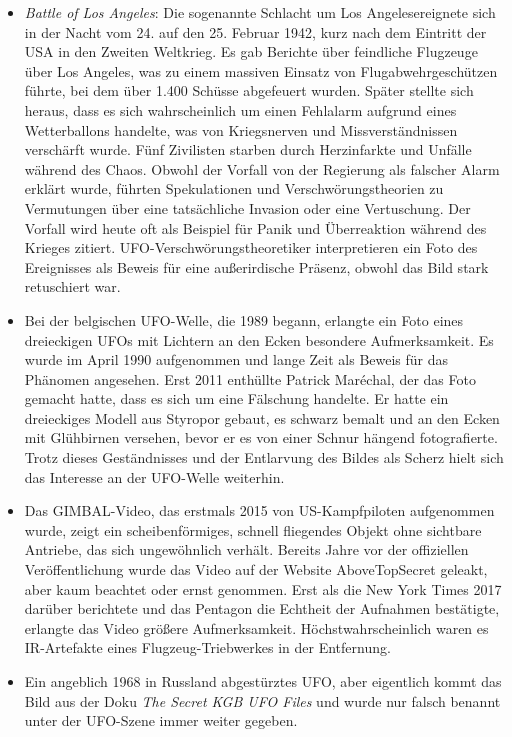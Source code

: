 \documentclass{scrartcl}
\begin{document}
\begin{itemize}
	\item \textit{Battle of Los Angeles}: Die sogenannte \frq Schlacht um Los Angeles\flq ereignete sich in der Nacht vom 24. auf den 25. Februar 1942, kurz nach dem Eintritt der USA in den Zweiten Weltkrieg. Es gab Berichte über feindliche Flugzeuge über Los Angeles, was zu einem massiven Einsatz von Flugabwehrgeschützen führte, bei dem über 1.400 Schüsse abgefeuert wurden. Später stellte sich heraus, dass es sich wahrscheinlich um einen Fehlalarm aufgrund eines Wetterballons handelte, was von Kriegsnerven und Missverständnissen verschärft wurde. Fünf Zivilisten starben durch Herzinfarkte und Unfälle während des Chaos. Obwohl der Vorfall von der Regierung als falscher Alarm erklärt wurde, führten Spekulationen und Verschwörungstheorien zu Vermutungen über eine tatsächliche Invasion oder eine Vertuschung. Der Vorfall wird heute oft als Beispiel für Panik und Überreaktion während des Krieges zitiert. UFO-Verschwörungstheoretiker interpretieren ein Foto des Ereignisses als Beweis für eine außerirdische Präsenz, obwohl das Bild stark retuschiert war. 
	\item Bei der belgischen UFO-Welle, die 1989 begann, erlangte ein Foto eines dreieckigen UFOs mit Lichtern an den Ecken besondere Aufmerksamkeit. Es wurde im April 1990 aufgenommen und lange Zeit als Beweis für das Phänomen angesehen. Erst 2011 enthüllte Patrick Maréchal, der das Foto gemacht hatte, dass es sich um eine Fälschung handelte. Er hatte ein dreieckiges Modell aus Styropor gebaut, es schwarz bemalt und an den Ecken mit Glühbirnen versehen, bevor er es von einer Schnur hängend fotografierte. Trotz dieses Geständnisses und der Entlarvung des Bildes als Scherz hielt sich das Interesse an der UFO-Welle weiterhin. 
	\item Das \frq GIMBAL\flq-Video, das erstmals 2015 von US-Kampfpiloten aufgenommen wurde, zeigt ein scheibenförmiges, schnell fliegendes Objekt ohne sichtbare Antriebe, das sich ungewöhnlich verhält. Bereits Jahre vor der offiziellen Veröffentlichung wurde das Video auf der Website AboveTopSecret geleakt, aber kaum beachtet oder ernst genommen. Erst als die New York Times 2017 darüber berichtete und das Pentagon die Echtheit der Aufnahmen bestätigte, erlangte das Video größere Aufmerksamkeit. Höchstwahrscheinlich waren es IR-Artefakte eines Flugzeug-Triebwerkes in der Entfernung. 
	\item Ein angeblich 1968 in Russland abgestürztes UFO, aber eigentlich kommt das Bild aus der Doku \textit{The Secret KGB UFO Files} und wurde nur falsch benannt unter der UFO-Szene immer weiter gegeben.
\end{itemize}
\end{document}
